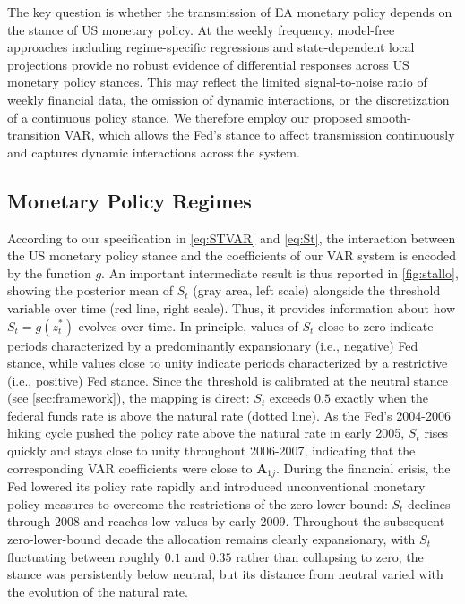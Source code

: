 The key question is whether the transmission of EA monetary policy depends on the stance of US monetary policy. At the weekly frequency, model-free approaches including regime-specific regressions and state-dependent local projections provide no robust evidence of differential responses across US monetary policy stances. This may reflect the limited signal-to-noise ratio of weekly financial data, the omission of dynamic interactions, or the discretization of a continuous policy stance. We therefore employ our proposed smooth-transition VAR, which allows the Fed's stance to affect transmission continuously and captures dynamic interactions across the system.
 
 
\subsection{Monetary Policy Regimes}\label{sec:regimes}
According to our specification in \autoref{eq:STVAR} and \autoref{eq:St}, the interaction between the US monetary policy stance and the coefficients of our VAR system is encoded by the function $g$. An important intermediate result is thus reported in \autoref{fig:stallo}, showing the posterior mean of $S_t$ (gray area, left scale) alongside the threshold variable over time (red line, right scale). Thus, it provides information about how $S_t=g(z_t^*)$ evolves over time. In principle, values of $S_t$ close to zero indicate periods characterized by a predominantly expansionary (i.e., negative) Fed stance, while values close to unity indicate periods characterized by a restrictive (i.e., positive) Fed stance. Since the threshold is calibrated at the neutral stance (see \autoref{sec:framework}), the mapping is direct: $S_t$ exceeds $0.5$ exactly when the federal funds rate is above the natural rate (dotted line). As the Fed's 2004-2006 hiking cycle pushed the policy rate above the natural rate in early 2005, $S_t$ rises quickly and stays close to unity throughout 2006-2007, indicating that the corresponding VAR coefficients were close to $\bm A_{1j}$. During the financial crisis, the Fed lowered its policy rate rapidly and introduced unconventional monetary policy measures to overcome the restrictions of the zero lower bound: $S_t$ declines through 2008 and reaches low values by early 2009. Throughout the subsequent zero-lower-bound decade the allocation remains clearly expansionary, with $S_t$ fluctuating between roughly $0.1$ and $0.35$ rather than collapsing to zero; the stance was persistently below neutral, but its distance from neutral varied with the evolution of the natural rate.


